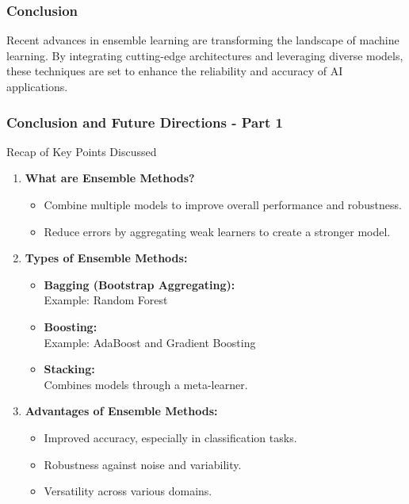 \documentclass[aspectratio=169]{beamer}
\begin{document}
\begin{frame}[fragile]
    \frametitle{Conclusion}
    Recent advances in ensemble learning are transforming the landscape of machine learning. By integrating cutting-edge architectures and leveraging diverse models, these techniques are set to enhance the reliability and accuracy of AI applications.
\end{frame}

\begin{frame}[fragile]
    \frametitle{Conclusion and Future Directions - Part 1}
    \begin{block}{Recap of Key Points Discussed}
        \begin{enumerate}
            \item \textbf{What are Ensemble Methods?}
            \begin{itemize}
                \item Combine multiple models to improve overall performance and robustness.
                \item Reduce errors by aggregating weak learners to create a stronger model.
            \end{itemize}

            \item \textbf{Types of Ensemble Methods:}
            \begin{itemize}
                \item \textbf{Bagging (Bootstrap Aggregating):} \\ Example: Random Forest
                \item \textbf{Boosting:} \\ Example: AdaBoost and Gradient Boosting
                \item \textbf{Stacking:} \\ Combines models through a meta-learner.
            \end{itemize}

            \item \textbf{Advantages of Ensemble Methods:}
            \begin{itemize}
                \item Improved accuracy, especially in classification tasks.
                \item Robustness against noise and variability.
                \item Versatility across various domains.
            \end{itemize}
        \end{enumerate}
    \end{block}
\end{frame}
\end{document}
